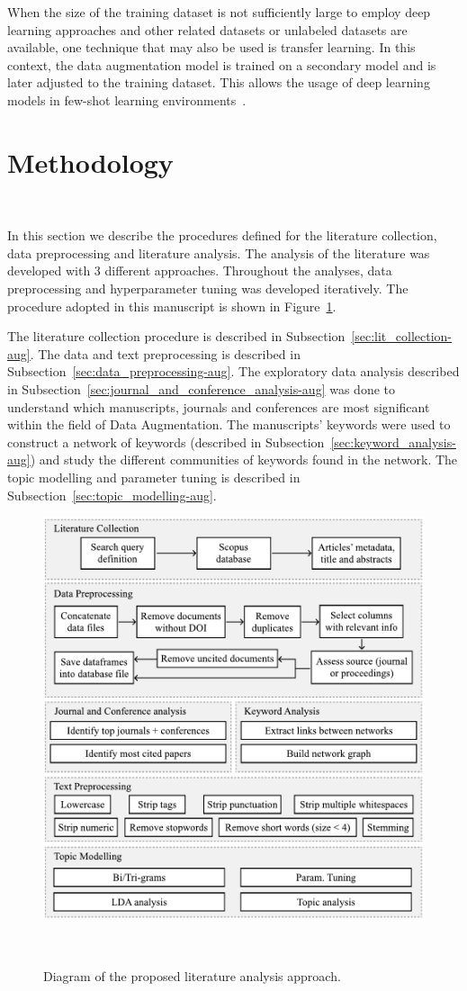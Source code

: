 When the size of the training dataset is not sufficiently large to employ deep
learning approaches and other related datasets or unlabeled datasets are
available, one technique that may also be used is transfer learning. In this
context, the data augmentation model is trained on a secondary model and is
later adjusted to the training dataset. This allows the usage of deep learning
models in few-shot learning environments~\cite{Antoniou2017}.

\section{Methodology}~\label{sec:methodology-aug}

In this section we describe the procedures defined for the literature
collection, data preprocessing and literature analysis. The analysis of the
literature was developed with 3 different approaches. Throughout the
analyses, data preprocessing and hyperparameter tuning was developed
iteratively. The procedure adopted in this manuscript is shown in
Figure~\ref{fig:slr_diagram}.

The literature collection procedure is described in
Subsection~\ref{sec:lit_collection-aug}. The data and text preprocessing is
described in Subsection~\ref{sec:data_preprocessing-aug}. The exploratory data
analysis described in Subsection~\ref{sec:journal_and_conference_analysis-aug} was
done to understand which manuscripts, journals and conferences are most
significant within the field of Data Augmentation. The manuscripts' keywords
were used to construct a network of keywords (described in
Subsection~\ref{sec:keyword_analysis-aug}) and study the different communities of
keywords found in the network. The topic modelling and parameter tuning is
described in Subsection~\ref{sec:topic_modelling-aug}. 

\begin{figure}
	\centering
	\includegraphics[width=.85\linewidth]{slr_diagram}
    \caption{Diagram of the proposed literature analysis approach.
    }~\label{fig:slr_diagram}
\end{figure}

